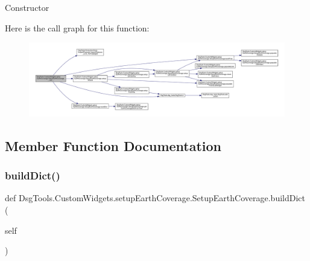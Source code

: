\begin{DoxyVerb}Constructor
\end{DoxyVerb}
 Here is the call graph for this function\+:
\nopagebreak
\begin{figure}[H]
\begin{center}
\leavevmode
\includegraphics[width=350pt]{class_dsg_tools_1_1_custom_widgets_1_1setup_earth_coverage_1_1_setup_earth_coverage_a085d58c4d33be69f515a489ba9ff6a29_cgraph}
\end{center}
\end{figure}


\subsection{Member Function Documentation}
\mbox{\label{class_dsg_tools_1_1_custom_widgets_1_1setup_earth_coverage_1_1_setup_earth_coverage_a9b14ae2d6974612eca27a3771d653146}} 
\subsubsection{\texorpdfstring{build\+Dict()}{buildDict()}}
{\footnotesize\ttfamily def Dsg\+Tools.\+Custom\+Widgets.\+setup\+Earth\+Coverage.\+Setup\+Earth\+Coverage.\+build\+Dict (\begin{DoxyParamCaption}\item[{}]{self }\end{DoxyParamCaption})}

